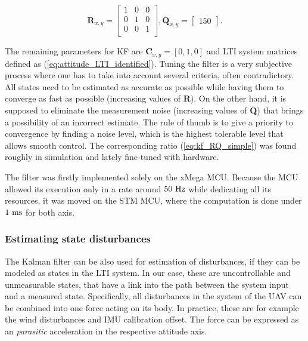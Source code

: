 \begin{equation}
\textbf{R}_{x,y} = \begin{bmatrix}
1 & 0 & 0 \\
0 & 1 & 0 \\
0 & 0 & 1 \\
\end{bmatrix}, 
\textbf{Q}_{x, y} = \begin{bmatrix}
150
\end{bmatrix}.
\label{eq:kf_RQ_simple}
\end{equation}

The remaining parameters for KF are $\textbf{C}_{x, y} = \left[0, 1, 0\right]$ and LTI system matrices defined as (\ref{eq:attitude_LTI_identified}). Tuning the filter is a very subjective process where one has to take into account several criteria, often contradictory. All states need to be estimated as accurate as possible while having them to converge as fast as possible (increasing values of \textbf{R}). On the other hand, it is supposed to eliminate the measurement noise (increasing values of \textbf{Q}) that brings a possibility of an incorrect estimate. The rule of thumb is to give a priority to convergence by finding a noise level, which is the highest tolerable level that allows smooth control. The corresponding ratio (\ref{eq:kf_RQ_simple}) was found roughly in simulation and lately fine-tuned with hardware.

The filter was firstly implemented solely on the xMega MCU. Because the MCU allowed its execution only in a rate around $50~\mathrm{Hz}$ while dedicating all its resources, it was moved on the STM MCU, where the computation is done under $1~\mathrm{ms}$ for both axis.

\subsubsection{Estimating state disturbances}

The Kalman filter can be also used for estimation of disturbances, if they can be modeled as states in the LTI system. In our case, these are uncontrollable and unmeasurable states, that have a link into the path between the system input and a measured state. Specifically, all disturbances in the system of the UAV can be combined into one force acting on its body. In practice, these are for example the wind disturbances and IMU calibration offset. The force can be expressed as an \textit{parasitic} acceleration in the respective attitude axis. 

